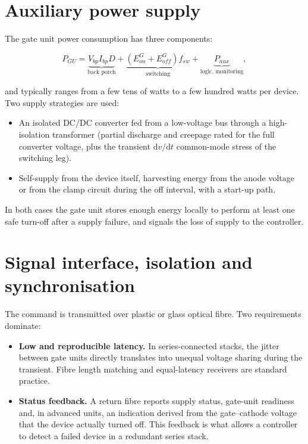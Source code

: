 \documentclass[11pt,a4paper]{report}
\begin{document}
\section{Auxiliary power supply}

The gate unit power consumption has three components:

\begin{equation}
P_{GU} = \underbrace{V_{bp} I_{bp} D}_{\text{back porch}}
       + \underbrace{(E_{on}^{G} + E_{off}^{G}) f_{sw}}_{\text{switching}}
       + \underbrace{P_{aux}}_{\text{logic, monitoring}} ,
\end{equation}

and typically ranges from a few tens of watts to a few hundred watts per device.
Two supply strategies are used:

\begin{itemize}[nosep]
  \item An isolated DC/DC converter fed from a low-voltage bus through a
        high-isolation transformer (partial discharge and creepage rated for the
        full converter voltage, plus the transient $\mathrm{d}v/\mathrm{d}t$
        common-mode stress of the switching leg).
  \item Self-supply from the device itself, harvesting energy from the anode
        voltage or from the clamp circuit during the off interval, with a
        start-up path.
\end{itemize}

In both cases the gate unit stores enough energy locally to perform at least one
safe turn-off after a supply failure, and signals the loss of supply to the
controller.

\section{Signal interface, isolation and synchronisation}

The command is transmitted over plastic or glass optical fibre. Two requirements
dominate:

\begin{itemize}[nosep]
  \item \textbf{Low and reproducible latency.} In series-connected stacks, the
        jitter between gate units directly translates into unequal voltage
        sharing during the transient. Fibre length matching and equal-latency
        receivers are standard practice.
  \item \textbf{Status feedback.} A return fibre reports supply status,
        gate-unit readiness and, in advanced units, an indication derived from
        the gate--cathode voltage that the device actually turned off. This
        feedback is what allows a controller to detect a failed device in a
        redundant series stack.
\end{itemize}
\end{document}
